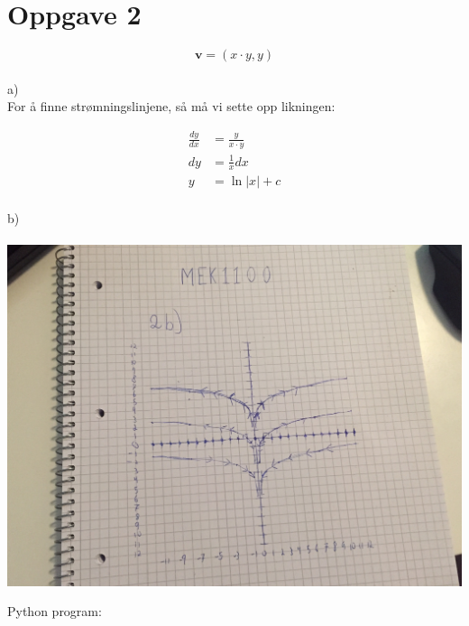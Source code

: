 \documentclass[12pt, a4paper]{article}
\begin{document}
\newpage
\section*{Oppgave 2}

\begin{equation}
    \textbf{v} = (x \cdot y, y)
\end{equation}
\\
a) \\
For å finne strømningslinjene, så må vi sette opp likningen:

\begin{equation}
    \begin{split}
        \frac{dy}{dx} &= \frac{y}{x \cdot y} \\
                   dy &= \frac{1}{x} dx \\
                    y &= \ln|x| + c
    \end{split}
\end{equation}
\\
b) \\ \\
\hspace*{-1.5cm}
\includegraphics[scale=0.15]{two_b_hand_drawn}


\newpage
Python program:

\end{document}
